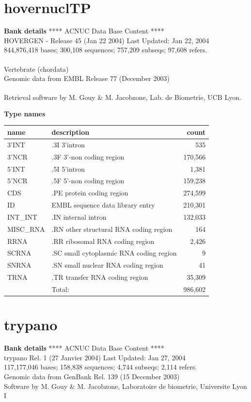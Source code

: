 \documentclass{article}
\begin{document}
\begin{Schunk}
\section{ hovernuclTP }
\textbf{Bank details}
               ****     ACNUC Data Base Content      ****                      \\
         HOVERGEN - Release 45 (Jan 22 2004) Last Updated: Jan 22, 2004\\
844,876,418 bases; 300,108 sequences; 757,209 subseqs; 97,608 refers.\\
                                                                               \\
                       Vertebrate (chordata)\\
             Genomic data from EMBL Release 77  (December 2003)\\
\\
Retrieval software by M. Gouy \& M. Jacobzone, Lab. de Biometrie, UCB Lyon.

\textbf{Type names}
\noindent\begin{tabular}{llr}
\hline \hline
name & description & count \\
\hline
3'INT  &  .3I 3'intron  &  535 \\
3'NCR  &  .3F  3'-non coding region  &  170,566 \\
5'INT  &  .5I 5'intron  &  1,381 \\
5'NCR  &  .5F  5'-non coding region  &  159,238 \\
CDS  &  .PE protein coding region  &  274,599 \\
ID  &  EMBL sequence data library entry  &  210,301 \\
INT\_INT  &  .IN  internal intron  &  132,033 \\
MISC\_RNA  &  .RN other structural RNA coding region  &  164 \\
RRNA  &  .RR ribosomal RNA coding region  &  2,426 \\
SCRNA  &  .SC small cytoplasmic RNA coding region  &  9 \\
SNRNA  &  .SN small nuclear RNA coding region  &  41 \\
TRNA  &  .TR transfer RNA coding region  &  35,309 \\
\hline
 & Total: & 986,602 \\
\hline \hline
\end{tabular}

\section{ trypano }
\textbf{Bank details}
             ****     ACNUC Data Base Content      ****                         \\
         trypano Rel. 1 (27 Janvier 2004) Last Updated: Jan 27, 2004\\
117,177,046 bases; 158,838 sequences; 4,744 subseqs; 2,114 refers.\\
	Genomic data from GenBank Rel. 139 (15 December 2003)\\
Software by M. Gouy \& M. Jacobzone, Laboratoire de biometrie, Universite Lyon I 


\end{Schunk}
\end{document}
